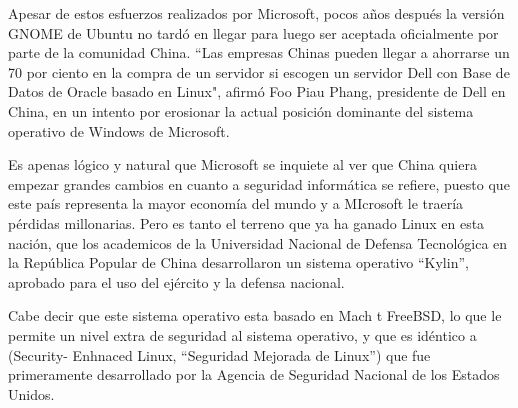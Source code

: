 Apesar de estos esfuerzos realizados por Microsoft, pocos años después la versión GNOME de Ubuntu no tardó en llegar para luego ser aceptada oficialmente por parte de la 
comunidad China. “Las empresas Chinas pueden llegar a ahorrarse un 70 por ciento en la compra de un servidor si escogen un servidor Dell con Base de Datos de Oracle basado 
en Linux", afirmó Foo Piau Phang, presidente de Dell en China, en un intento por erosionar la actual posición dominante del sistema operativo de Windows de Microsoft.

Es apenas lógico y natural que Microsoft se inquiete al ver que China quiera empezar grandes cambios en cuanto a seguridad informática se refiere, puesto que este país 
representa la mayor economía del mundo y a MIcrosoft le traería pérdidas millonarias. Pero es tanto el terreno que ya ha ganado Linux en esta nación, que los academicos de 
la Universidad Nacional de Defensa Tecnológica en la República Popular de China desarrollaron un sistema operativo “Kylin”, aprobado para el uso del ejército y la defensa 
nacional.

Cabe decir que este sistema operativo esta basado en Mach t FreeBSD, lo que le permite un nivel extra de seguridad al sistema operativo, y que es idéntico a (Security-
Enhnaced Linux, “Seguridad Mejorada de Linux”) que fue primeramente desarrollado por la Agencia de Seguridad Nacional de los Estados Unidos.